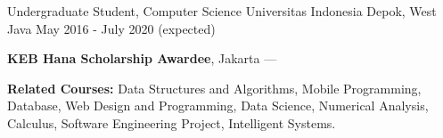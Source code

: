 
\begin{cventries}
  \cventry
    {Undergraduate Student, Computer Science} %
    {Universitas Indonesia} %
    {Depok, West Java} %
    {May 2016 - July 2020 (expected)} %
    {
      \begin{cvitems} %
         \item {\textbf{KEB Hana Scholarship Awardee}, Jakarta --- }
         \vspace{0.5mm}
         \item \textbf{Related Courses:} Data Structures and Algorithms, Mobile Programming, Database, Web Design and Programming, Data Science, Numerical Analysis, Calculus, Software Engineering Project, Intelligent Systems.
      \end{cvitems}
    }
\end{cventries}
